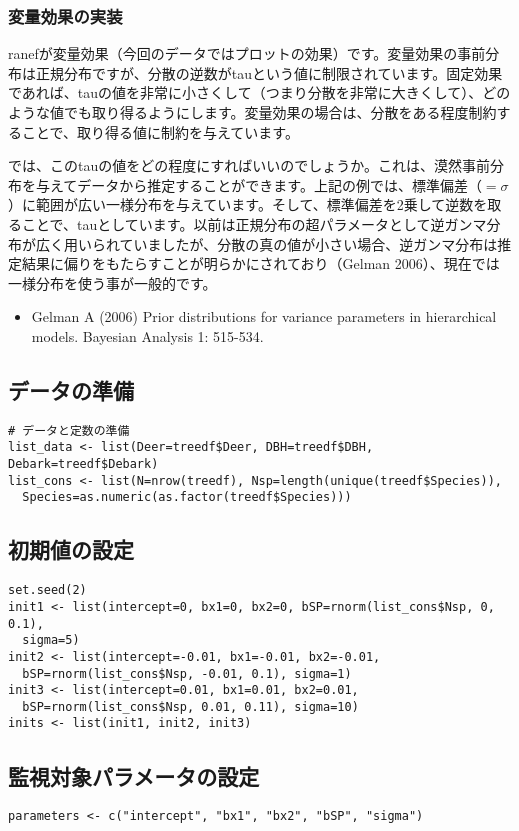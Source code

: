 		\subsubsection{変量効果の実装}
ranefが変量効果（今回のデータではプロットの効果）です。変量効果の事前分布は正規分布ですが、分散の逆数がtauという値に制限されています。固定効果であれば、tauの値を非常に小さくして（つまり分散を非常に大きくして）、どのような値でも取り得るようにします。変量効果の場合は、分散をある程度制約することで、取り得る値に制約を与えています。

では、このtauの値をどの程度にすればいいのでしょうか。これは、漠然事前分布を与えてデータから推定することができます。上記の例では、標準偏差（$=\sigma$）に範囲が広い一様分布を与えています。そして、標準偏差を2乗して逆数を取ることで、tauとしています。以前は正規分布の超パラメータとして逆ガンマ分布が広く用いられていましたが、分散の真の値が小さい場合、逆ガンマ分布は推定結果に偏りをもたらすことが明らかにされており（Gelman 2006）、現在では一様分布を使う事が一般的です。
\begin{itemize}
\item Gelman A (2006) Prior distributions for variance parameters in hierarchical models. Bayesian Analysis 1: 515-534.
\end{itemize}

\subsection{データの準備}
\begin{verbatim}
# データと定数の準備
list_data <- list(Deer=treedf$Deer, DBH=treedf$DBH, Debark=treedf$Debark)
list_cons <- list(N=nrow(treedf), Nsp=length(unique(treedf$Species)),
  Species=as.numeric(as.factor(treedf$Species)))
\end{verbatim}

	\subsection{初期値の設定}
\begin{verbatim}
set.seed(2)
init1 <- list(intercept=0, bx1=0, bx2=0, bSP=rnorm(list_cons$Nsp, 0, 0.1),
  sigma=5)
init2 <- list(intercept=-0.01, bx1=-0.01, bx2=-0.01,
  bSP=rnorm(list_cons$Nsp, -0.01, 0.1), sigma=1)
init3 <- list(intercept=0.01, bx1=0.01, bx2=0.01,
  bSP=rnorm(list_cons$Nsp, 0.01, 0.11), sigma=10)
inits <- list(init1, init2, init3)
\end{verbatim}

	\subsection{監視対象パラメータの設定}
\begin{verbatim}
parameters <- c("intercept", "bx1", "bx2", "bSP", "sigma")
\end{verbatim}

